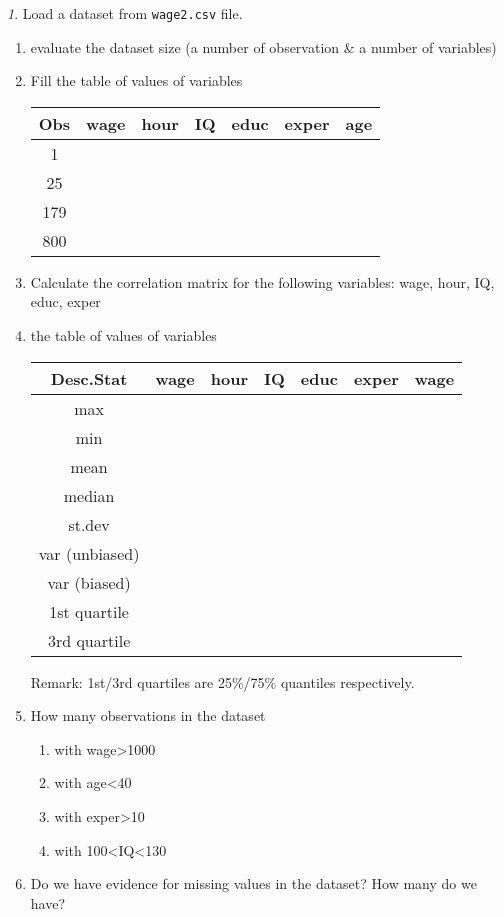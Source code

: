 \documentclass[12pt]{article}
\theoremstyle{remark}
\newtheorem{problem}{}[section]
\begin{document}
\begin{problem}
Load a dataset from \texttt{wage2.csv} file.
\begin{enumerate}
	\item evaluate the dataset size (a number of observation \& a number of variables)
	\item Fill the table of values of variables
	\begin{center}
		\begin{tabular}{|c|c|c|c|c|c|c|} \hline
			Obs & wage & hour& IQ & educ & exper & age \\ \hline\hline
			1 & & & & & & \\ \hline
			25 & & & &  & & \\ \hline
			179 & & & & & & \\ \hline
			800 & & & & & & \\ \hline
		\end{tabular}
	\end{center}
	\item Calculate the correlation matrix for the following
	variables: wage, hour, IQ, educ, exper 
	\item the table of values of variables
	\begin{center}
		\begin{tabular}{|c|c|c|c|c|c|c|} \hline
			Desc.Stat & wage & hour& IQ & educ & exper & wage \\ \hline\hline
			max & & & & & & \\ \hline
			min & & & & & & \\ \hline
			mean & & & & & & \\ \hline
			median & & & & & & \\ \hline
			st.dev & & & & & & \\ \hline
			var (unbiased) & & & & & & \\ \hline
			var (biased) & & & & & & \\ \hline
			1st quartile & & & & & & \\ \hline
			3rd quartile & & & & & & \\ \hline
		\end{tabular}
	\end{center}
	Remark: 1st/3rd quartiles are 25\%/75\% quantiles respectively.
	\item How many observations in the dataset 
		\begin{enumerate}
			\item with wage>1000
			\item with age<40
			\item with exper>10
			\item with 100<IQ<130
		\end{enumerate}
	\item Do we have evidence for missing values in the dataset?
	How many do we have?
\end{enumerate}
\end{problem}
\end{document}
